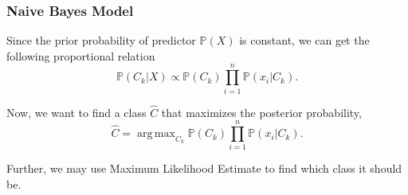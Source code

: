 \documentclass[aspectratio = 169]{beamer}
\DeclareMathOperator*{\argmax}{arg \, max}
\begin{document}
\begin{frame}

\frametitle{Naive Bayes Model}

Since the prior probability of predictor $\mathbb{P}(X)$ is constant, we can get the following proportional relation 
$$
\mathbb{P}(C_k \vert X) \propto \mathbb{P}(C_k) \prod_{i = 1}^n \mathbb{P}(x_i \vert C_k).
$$


Now, we want to find a class $\hat{C}$ that maximizes the posterior probability, 
$$
\hat{C} = \argmax_{C_k} \mathbb{P}(C_k) \prod_{i = 1}^n \mathbb{P}(x_i \vert C_k).
$$

Further, we may use Maximum Likelihood Estimate to find which class it should be.

\end{frame}
\end{document}
